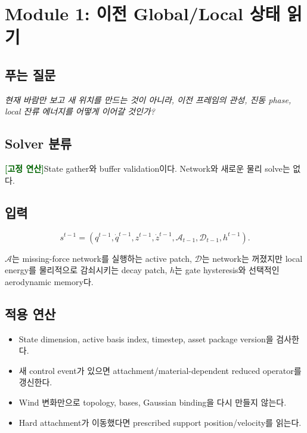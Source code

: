 \documentclass[11pt,a4paper]{article}
\newcommand{\deterministic}{\textcolor{darkgreen}{\textbf{[고정 연산]}}}
\begin{document}
\section{Module 1: 이전 Global/Local 상태 읽기}

\subsection*{푸는 질문}

\emph{현재 바람만 보고 새 위치를 만드는 것이 아니라,
이전 프레임의 관성, 진동 phase, local 잔류 에너지를 어떻게 이어갈 것인가?}

\subsection*{Solver 분류}

\deterministic State gather와 buffer validation이다. Network와 새로운 물리 solve는 없다.

\subsection*{입력}

\begin{equation}
  s^{t-1}
  =
  \left(
  q^{t-1},\dot q^{t-1},
  z^{t-1},\dot z^{t-1},
  \mathcal A_{t-1},
  \mathcal D_{t-1},
  h^{t-1}
  \right).
\end{equation}

\(\mathcal A\)는 missing-force network를 실행하는 active patch,
\(\mathcal D\)는 network는 꺼졌지만 local energy를 물리적으로 감쇠시키는 decay patch,
\(h\)는 gate hysteresis와 선택적인 aerodynamic memory다.

\subsection*{적용 연산}

\begin{itemize}[leftmargin=1.5em]
  \item State dimension, active basis index, timestep, asset package version을 검사한다.
  \item 새 control event가 있으면 attachment/material-dependent reduced operator를 갱신한다.
  \item Wind 변화만으로 topology, bases, Gaussian binding을 다시 만들지 않는다.
  \item Hard attachment가 이동했다면 prescribed support position/velocity를 읽는다.
\end{itemize}
\end{document}
